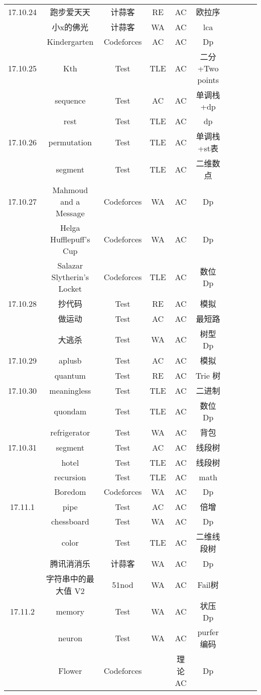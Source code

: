\documentclass[landscape]{article}
\begin{document}
\begin{longtable}{cccccccccc}
  \hline
  17.10.24 &跑步爱天天& 计蒜客 &RE &AC& 欧拉序\\
  &小x的佛光 &计蒜客 &WA &AC& lca\\
  & Kindergarten &Codeforces& AC& AC &Dp\\
  \hline
  17.10.25 &Kth& Test& TLE& AC& 二分+Two points\\
  &sequence& Test& AC &AC &单调栈+dp\\
  &rest& Test &TLE &AC &dp\\
  \hline
  17.10.26 &permutation &Test &TLE &AC& 单调栈+st表\\
  &segment &Test &TLE &AC& 二维数点\\
  \hline
  17.10.27 &Mahmoud and a Message &Codeforces &WA &AC &Dp\\
  &Helga Hufflepuff’s Cup &Codeforces& WA& AC &Dp\\
  &Salazar Slytherin’s Locket &Codeforces &TLE& AC& 数位Dp\\
  \hline
  17.10.28 &抄代码 &Test& RE &AC &模拟\\
  &做运动 &Test &AC& AC& 最短路\\
  &大逃杀 &Test& WA& AC &树型Dp\\
  \hline
  17.10.29 &aplusb &Test &AC& AC& 模拟\\
  &quantum &Test& RE &AC &Trie 树\\
  \hline
  17.10.30 & meaningless & Test & TLE & AC & 二进制\\
  & quondam & Test & TLE & AC & 数位Dp\\
  & refrigerator & Test & WA & AC & 背包\\
  \hline
  17.10.31 & segment & Test & AC & AC & 线段树\\
  & hotel & Test & TLE & AC & 线段树\\
  & recursion & Test & TLE & AC & math\\
  & Boredom & Codeforces & WA & AC & Dp\\
  \hline
  17.11.1 & pipe & Test & AC & AC & 倍增\\
  & chessboard & Test & WA & AC & Dp\\
  & color & Test  & TLE & AC & 二维线段树\\
  & 腾讯消消乐 & 计蒜客 & WA & AC & Dp\\
  & 字符串中的最大值 V2 & 51nod & WA & AC & Fail树\\
  \hline
  17.11.2 & memory & Test & WA & AC & 状压Dp\\
  & neuron & Test & WA & AC & purfer编码\\
  & Flower & Codeforces & & 理论AC & Dp\\
  
\end{longtable}
\end{document}

